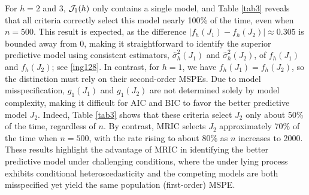 \documentclass[ejsv2]{imsart}
\theoremstyle{plain}
\theoremstyle{definition}
\theoremstyle{remark}
\begin{document}
For $h=2$ and 3,
${\cal J}_{1}(h)$ only contains a single model,
and Table \ref{tab3} reveals that all criteria correctly select this model nearly 100\% of the time,
even when $n=500$.
This result is expected, as the difference
$|f_h(J_1)-f_h(J_2)|\approx0.305$ is bounded away from 0,
making it straightforward to identify the superior predictive model using consistent estimators,
$\hat{\sigma}^2_{h}(J_1)$ and
$\hat{\sigma}^2_{h}(J_2)$,
of $f_h(J_1)$ and $f_h(J_2)$;
see \eqref{ing128}.
In contrast, for $h=1$, we have
$f_h(J_1)=f_h(J_2)$,
so the distinction must rely on their second-order MSPEs.
Due to model misspecification,
$g_1(J_1)$ and $g_1(J_2)$
are not determined solely by model complexity, making it difficult for AIC and BIC to favor the better predictive model $J_2$. 
Indeed, Table \ref{tab3} shows that
these criteria select 
$J_2$ only about 50\% of the time, regardless of $n$.
By contrast, MRIC selects $J_2$ approximately 70\% of the time when $n=500$,
with the rate rising to about
80\% as $n$
increases to 2000.
These results highlight the advantage of MRIC in identifying the better predictive model under challenging conditions, where the under lying process exhibits conditional heteroscedasticity and the competing models are both misspecified yet yield the same population (first-order) MSPE.


\end{document}
